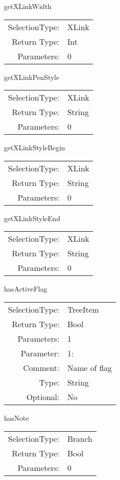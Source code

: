 \item getXLinkWidth\\
\begin{tabular}{rl}
  SelectionType: & XLink\\
    Return Type: & Int\\
     Parameters: & 0\\
\end{tabular}

\item getXLinkPenStyle\\
\begin{tabular}{rl}
  SelectionType: & XLink\\
    Return Type: & String\\
     Parameters: & 0\\
\end{tabular}

\item getXLinkStyleBegin\\
\begin{tabular}{rl}
  SelectionType: & XLink\\
    Return Type: & String\\
     Parameters: & 0\\
\end{tabular}

\item getXLinkStyleEnd\\
\begin{tabular}{rl}
  SelectionType: & XLink\\
    Return Type: & String\\
     Parameters: & 0\\
\end{tabular}

\item hasActiveFlag\\
\begin{tabular}{rl}
  SelectionType: & TreeItem\\
    Return Type: & Bool\\
     Parameters: & 1\\
   Parameter: &  1:\\
        Comment: & Name of flag\\
           Type: & String\\
       Optional: &  No\\
\end{tabular}

\item hasNote\\
\begin{tabular}{rl}
  SelectionType: & Branch\\
    Return Type: & Bool\\
     Parameters: & 0\\
\end{tabular}

